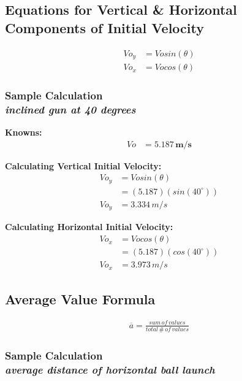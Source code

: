 \newpage

\subsection{Equations for Vertical \& Horizontal Components of Initial Velocity } 

\begin{align}
	V\!o_y &= V\!osin(\theta) \label{eq:YVO} \\
	V\!o_x &= V\!ocos(\theta) \label{eq:XVO} 
\end{align}

\subsubsection{Sample Calculation \\ {\normalfont \small\textit{inclined gun at 40 degrees}}}

{\centering
\textbf{Knowns:}
\begin{align*}
	V\!o &= \boldsymbol{5.187\,m/s}
\end{align*}

\textbf{Calculating Vertical Initial Velocity:}
\begin{align*}
	V\!o_y &= V\!osin(\theta) \\ 
	&= (5.187)(sin(40^\circ)) \\
	V\!o_y &= \boxed{3.334\,m/s}
\end{align*}

\textbf{Calculating Horizontal Initial Velocity:} 
\begin{align*}
	V\!o_x &= V\!ocos(\theta) \\ 
	&= (5.187)(cos(40^\circ)) \\
	V\!o_x &= \boxed{3.973\,m/s}
\end{align*}}


\subsection{Average Value Formula} 

\begin{align*}
		\overline{a} = \frac{sum\,of\,values}{total\, \#\,of\,values} 
\end{align*}

\subsubsection{Sample Calculation \\ {\normalfont \small\textit{average distance of horizontal ball launch}}}

